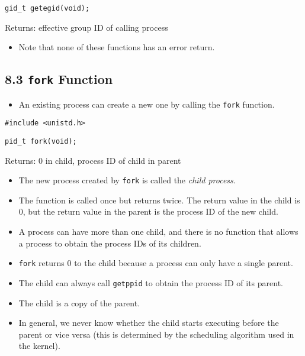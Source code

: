 \documentclass[]{article} \usepackage[all]{xy}
\newcommand{\code}{\texttt}
\begin{document}
\code{gid\_t getegid(void);}

Returns: effective group ID of calling process

\begin{itemize}
\item Note that none of these functions has an error return.
\end{itemize}

\subsection*{8.3 \code{fork} Function}
\begin{itemize}
\item An existing process can create a new one by calling the \code{fork}
function.
\end{itemize}

\code{\#include <unistd.h>}

\code{pid\_t fork(void);}

Returns: 0 in child, process ID of child in parent

\begin{itemize}
\item The new process created by \code{fork} is called the \emph{child process}.
\item The function is called once but returns twice. The return value in the
child is 0, but the return value in the parent is the process ID of the new
child.
\item A process can have more than one child, and there is no function that
allows a process to obtain the process IDs of its children.
\item \code{fork} returns 0 to the child because a process can only have a
single parent.
\item The child can always call \code{getppid} to obtain the process ID of its
parent.
\item The child is a copy of the parent.
\item In general, we never know whether the child starts executing before the
parent or vice versa (this is determined by the scheduling algorithm used in the
kernel).
\end{itemize}
\end{document}
